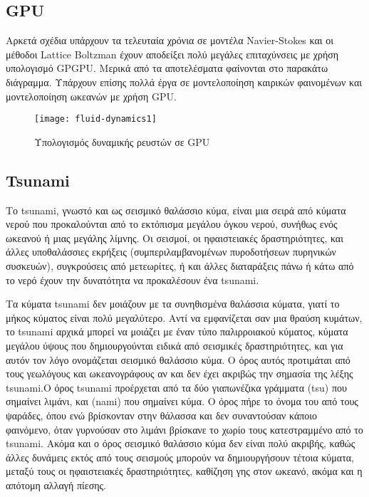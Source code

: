 \subsection{GPU}
Αρκετά σχέδια υπάρχουν τα τελευταία χρόνια σε μοντέλα Navier-Stokes και οι μέθοδοι Lattice Boltzman έχουν αποδείξει πολύ μεγάλες επιταχύνσεις με χρήση υπολογισμό GPGPU. Μερικά από τα αποτελέσματα φαίνονται στο παρακάτω διάγραμμα. Υπάρχουν επίσης πολλά έργα σε μοντελοποίηση καιρικών φαινομένων και μοντελοποίηση ωκεανών με χρήση GPU.

\begin{figure}[h]
\centering
\hspace*{-0.5in}
\texttt{[image: fluid-dynamics1]}
\caption{Υπολογισμός δυναμικής ρευστών σε GPU}
\end{figure}
 
\subsection{Tsunami}
Το tsunami, γνωστό και ως σεισμικό θαλάσσιο κύμα, είναι μια σειρά από κύματα νερού που προκαλούνται από το εκτόπισμα μεγάλου όγκου νερού, συνήθως ενός ωκεανού ή μιας μεγάλης λίμνης. Οι σεισμοί, οι ηφαιστειακές δραστηριότητες, και άλλες υποθαλάσσιες εκρήξεις (συμπεριλαμβανομένων πυροδοτήσεων πυρηνικών συσκευών), συγκρούσεις από μετεωρίτες, ή και άλλες διαταράξεις πάνω ή κάτω από το νερό έχουν την δυνατότητα να προκαλέσουν ένα tsunami.

Τα κύματα tsunami δεν μοιάζουν με τα συνηθισμένα θαλάσσια κύματα, γιατί το μήκος κύματος είναι πολύ μεγαλύτερο. Αντί να εμφανίζεται σαν μια θραύση κυμάτων, το tsunami αρχικά μπορεί να μοιάζει με έναν τύπο παλιρροιακού κύματος,  κύματα μεγάλου ύψους που δημιουργούνται ειδικά από σεισμικές δραστηριότητες, και για αυτόν τον λόγο ονομάζεται σεισμικό θαλάσσιο κύμα. Ο όρος αυτός προτιμάται από τους γεωλόγους και ωκεανογράφους αν και δεν έχει ακριβώς την σημασία της λέξης tsunami.Ο όρος tsunami προέρχεται από τα δύο γιαπωνέζικα γράμματα {\large{}}(tsu) που σημαίνει λιμάνι, και {\large{}}(nami) που σημαίνει κύμα. Ο όρος πήρε το όνομα του από τους ψαράδες, όπου ενώ βρίσκονταν στην θάλασσα και δεν συναντούσαν κάποιο φαινόμενο, όταν γυρνούσαν στο λιμάνι βρίσκανε το χωρίο τους κατεστραμμένο από το tsunami. Ακόμα και ο όρος σεισμικό θαλάσσιο κύμα δεν είναι πολύ ακριβής, καθώς άλλες δυνάμεις εκτός από τους σεισμούς μπορούν να δημιουργήσουν τέτοια κύματα, μεταξύ τους οι ηφαιστειακές δραστηριότητες, καθίζηση γης στον ωκεανό, ακόμα και η απότομη αλλαγή πίεσης. \cite{fluiddynamics-3}
 
